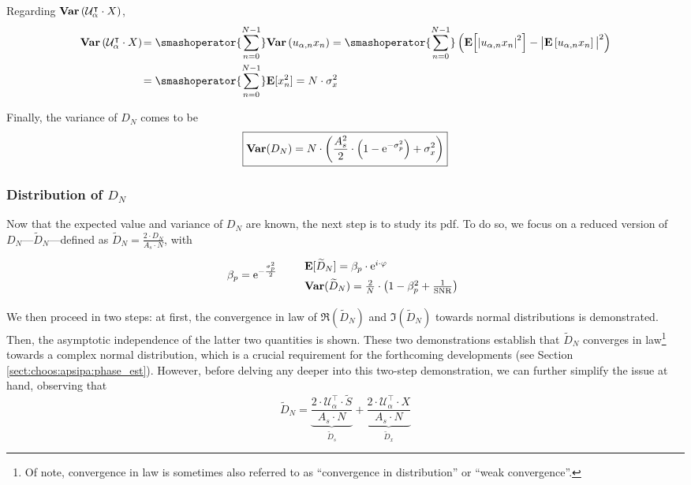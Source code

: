 Regarding $\mathbf{Var}\left(\mathcal{U}_\alpha^\intercal\cdot X\right)$,
\begin{equation}\label{eq:choos:apsipa:var_bbg_ideal}
	\begin{aligned}
		\var\left(\mathcal{U}_\alpha^\intercal \cdot X\right)\! &= \smashoperator{\sum_{n=0}^{N-1}} \var\left( u_{\alpha, n}  x_n\right) = \smashoperator{\sum_{n=0}^{N-1}} \left( \esp \Bigl[ \left|u_{\alpha, n} x_n\right|^2 \Bigr] - \big|\esp\left[ u_{\alpha, n} x_n\right] \big|^2 \right) \\
		&= \smashoperator{\sum_{n=0}^{N-1}} \esp[x_n^2] = N \cdot \sigma_x^2
	\end{aligned}
\end{equation}

Finally, the variance of $D_N$ comes to be
\begin{equation}
	\boxed{\mathbf{Var}(D_N) = N \cdot \left( \frac{A_s^2}{2} \cdot \left(1 - \mathrm{e}^{-\sigma_p^2} \right) + \sigma_x^2 \right) }
\end{equation}

\subsubsection{Distribution of \texorpdfstring{$D_N$}{DN}}\label{subsect:choos:apsipa:dpdf}

Now that the expected value and variance of $D_N$ are known, the next step is to study its \gls{pdf}. To do so, we focus on a reduced version of $D_N$---$\widetilde{D}_N$---defined as $\widetilde{D}_N = \frac{2 \cdot D_N}{A_s \cdot N}$, with
\begin{equation}\label{eq:choos:apsipa:d_tilde_def}
	\begingroup
	\renewcommand*{\arraystretch}{1.5}
	\beta_p = \e^{-\frac{\sigma_p^2}{2}}
	\qquad
	\begin{array}{l}
		\esp[\widetilde{D}_N] = \beta_p \cdot \e^{i \cdot \varphi} \\
		\var(\widetilde{D}_N) = \frac{2}{N} \cdot \left(1 - \beta_p^2 + \frac{1}{\text{SNR}}\right)
	\end{array}
	\endgroup
\end{equation}

We then proceed in two steps: at first, the convergence in law of $\Re(\widetilde{D}_N)$ and $\Im(\widetilde{D}_N)$ towards normal distributions is demonstrated. Then, the asymptotic independence of the latter two quantities is shown. These two demonstrations establish that $\widetilde{D}_N$ converges in law\footnote{Of note, convergence in law is sometimes also referred to as \enquote{convergence in distribution} or \enquote{weak convergence}\cite[p.~18]{vandervaart1996weak}.} towards a complex normal distribution\cite[pp. 540--559]{lapidoth2017}, which is a crucial requirement for the forthcoming developments (see Section \ref{sect:choos:apsipa:phase_est}). However, before delving any deeper into this two-step demonstration, we can further simplify the issue at hand, observing that
\begin{equation}
	\widetilde{D}_N = \underbrace{\frac{2\cdot \mathcal{U}_\alpha^\intercal\cdot \widetilde{S}}{A_s \cdot N}}_{\widetilde{D}_s} + \underbrace{\frac{2\cdot \mathcal{U}_\alpha^\intercal\cdot X}{A_s \cdot N}}_{\widetilde{D}_x}
\end{equation}

